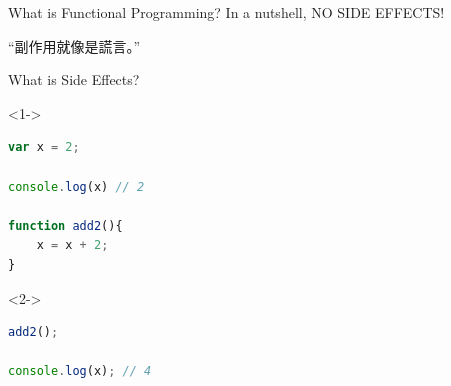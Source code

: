 \documentclass[10pt]{beamer}
\begin{document}

\begin{frame}{What is Functional Programming?}
In a nutshell,
{\Huge NO SIDE EFFECTS!}

\pause
\begin{exampleblock}{}
  {\large ``副作用就像是謊言。''}
  \vskip5mm
  \hspace*{}
\end{exampleblock}
\end{frame}



\begin{frame}[fragile]{What is Side Effects?}

\begin{overlayarea}{\linewidth}{.8\textheight}

\begin{onlyenv}<1->
\begin{lstlisting}[language=JavaScript]
var x = 2;

console.log(x) // 2

function add2(){
    x = x + 2;
}
\end{lstlisting}
\end{onlyenv}

\begin{onlyenv}<2->
\begin{lstlisting}[language=JavaScript,firstnumber=8]
add2();

console.log(x); // 4
\end{lstlisting}
\end{onlyenv}


\end{overlayarea}  
    
\end{frame}


\end{document}
